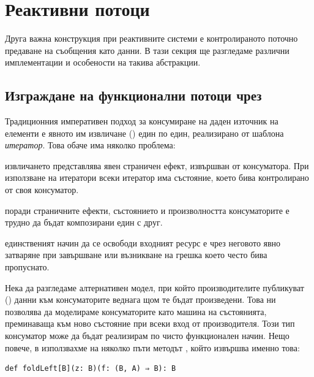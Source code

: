 \section{Реактивни потоци}
\label{sec:reactive-streams}

Друга важна конструкция при реактивните системи е контролираното поточно предаване на съобщения като данни. В тази секция ще разгледаме различни имплементации и особености на такива абстракции.

\subsection{Изграждане на функционални потоци чрез }
\label{sec:iteratee}

Традиционния императивен подход за консумиране на даден източник на елементи е явното им извличане () един по един, реализирано от шаблона \emph{итератор}. Това обаче има няколко проблема:

\begin{itemize*}
  \item извличането представлява явен страничен ефект, извършван от консуматора. При използване на итератори всеки итератор има състояние, което бива контролирано от своя консуматор.
  
  \item поради страничните ефекти, състоянието и произволността консуматорите е трудно да бъдат композирани един с друг.
  
  \item единственият начин да се освободи входният ресурс е чрез неговото явно затваряне при завършване или възникване на грешка което често бива пропуснато.
\end{itemize*}

Нека да разгледаме алтернативен модел, при който производителите публикуват () данни към консуматорите веднага щом те бъдат произведени. Това ни позволява да моделираме консуматорите като машина на състоянията, преминаваща към ново състояние при всеки вход от производителя. Този тип консуматор може да бъдат реализирам по чисто функционален начин. Нещо повече, в  използвахме на няколко пъти методът , който извършва именно това:

\begin{lstlisting}
def foldLeft[B](z: B)(f: (B, A) ⇒ B): B
\end{lstlisting}

